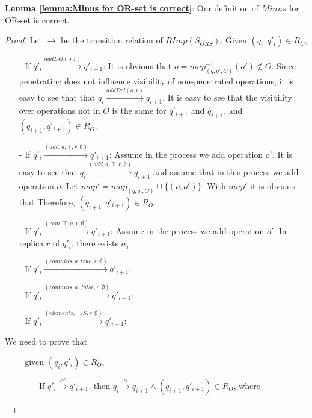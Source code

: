 {\noindent \bf Lemma \ref{lemma:Minus for OR-set is correct}}: Our definition of $Minus$ for OR-set is correct.

\begin {proof}

Let $\rightarrow$ be the transition relation of $RImp(S_{\mathit{ORS}})$. Given $(q_i,q'_i) \in R_{O}$,

\begin{itemize}
\setlength{\itemsep}{0.5pt}
\item[-] If $q'_i {\xrightarrow{addDel(o,r)}} q'_{i+1}$: It is obvious that $o = map_{(q,q',O)}^{-1}(o') \notin O$. Since penetrating does not influence visibility of non-penetrated operations, it is easy to see that that $q_i {\xrightarrow{addDel(o,r)}} q_{i+1}$. It is easy to see that the visibility over operations not in $O$ is the same for $q'_{i+1}$ and $q_{i+1}$, and $(q_{i+1},q'_{i+1}) \in R_{O}$.

\item[-] If $q'_i {\xrightarrow{(add,a,\top,r,\emptyset)}} q'_{i+1}$: Assume in the process we add operation $o'$. It is easy to see that $q_i {\xrightarrow{(add,a,\top,r,\emptyset)}} q_{i+1}$ and assume that in this process we add operation $o$. Let $map' = map_{(q,q',O)} \cup \{ (o,o') \}$. With $map'$ it is obvious that Therefore, $(q_{i+1},q'_{i+1}) \in R_{O}$.

\item[-] If $q'_i {\xrightarrow{(rem,\top,a,r,\emptyset)}} q'_{i+1}$: Assume in the process we add operation $o'$. In replica $r$ of $q'_i$, there exists $o_a$

\item[-] If $q'_i {\xrightarrow{(contains,a,\mathit{true},r,\emptyset)}} q'_{i+1}$:

\item[-] If $q'_i {\xrightarrow{(contains,a,\mathit{false},r,\emptyset)}} q'_{i+1}$:

\item[-] If $q'_i {\xrightarrow{(elements,\top,S,r,\emptyset)}} q'_{i+1}$:
\end{itemize}



We need to prove that

\begin{itemize}
\setlength{\itemsep}{0.5pt}
\item[-] given $(q_i,q'_i) \in R_{O}$,
    \begin{itemize}
    \setlength{\itemsep}{0.5pt}
    \item[-] If $q'_i {\xrightarrow{\alpha'}} q'_{i+1}$, then $q_i {\xrightarrow{\alpha}} q_{i+1} \wedge (q_{i+1},q'_{i+1}) \in R_{O}$, where


\end{itemize}
\end{itemize}
\end{proof}
